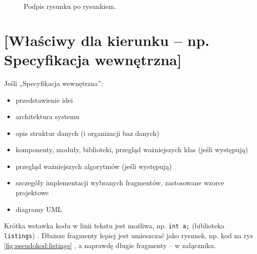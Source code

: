 \documentclass[a4paper,twoside,12pt]{book}
\begin{document}
 
\begin{figure}
\centering
{}
\caption{Podpis rysunku po rysunkiem.}
\label{fig:2}
\end{figure}



\chapter{[Właściwy dla kierunku -- np. Specyfikacja wewnętrzna]}
\label{ch:05}


Jeśli „Specyfikacja wewnętrzna”:
\begin{itemize}
\item przedstawienie idei
\item architektura systemu
\item opis struktur danych (i organizacji baz danych)
\item komponenty, moduły, biblioteki, przegląd ważniejszych klas (jeśli występują)
\item przegląd ważniejszych algorytmów (jeśli występują)
\item szczegóły implementacji wybranych fragmentów, zastosowane wzorce projektowe
\item diagramy UML
\end{itemize}



Krótka wstawka kodu w linii tekstu jest możliwa, np.  \lstinline|int a;| (biblioteka \texttt{listings})%
. 
Dłuższe fragmenty lepiej jest umieszczać jako rysunek, np. kod na rys \ref{fig:pseudokod:listings}%
, a naprawdę długie fragmenty – w załączniku.
\end{document}
